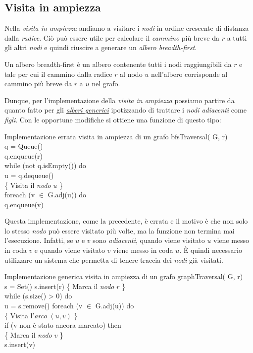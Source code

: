 \subsection{Visita in ampiezza}
Nella \emph{visita in ampiezza} andiamo a visitare i \emph{nodi} in ordine
crescente di distanza dalla \emph{radice}. Ciò può essere utile per calcolare
il \emph{cammino} più breve da $r$ a tutti gli altri \emph{nodi} e quindi
riuscire a generare un \emph{albero breadth-first}.
\begin{definition}
    Un albero breadth-first è un albero contenente tutti i nodi raggiungibili da
    $r$ e tale per cui il cammino dalla radice $r$ al nodo $u$ nell'albero
    corrisponde al cammino più breve da $r$ a $u$ nel grafo.
\end{definition}\noindent
Dunque, per l'implementazione della \emph{visita in ampiezza} possiamo partire
da quanto fatto per gli \hyperref[code:15]{\emph{alberi generici}} ipotizzando
di trattare i \emph{nodi adiacenti} come \emph{figli}. Con le opportune
modifiche si ottiene una funzione di questo tipo:
\begin{minicode}{Implementazione errata visita in ampiezza di un grafo}
\ind bfsTraversal( G,  r)\\
     q = Queue()\\
    q.enqueue(r)\\
    \indf while (not q.isEmpty()) do\\
         u = q.dequeue()\\
        \{ Visita il \emph{nodo} $u$ \}\\
        \indff foreach (v $\in$ G.adj(u)) do\\
            q.enqueue(v)\hfill{}
\end{minicode}\noindent
Questa implementazione, come la precedente, è errata e il motivo è che non solo
lo stesso \emph{nodo} può essere visitato più volte, ma la funzione non termina
mai l'esecuzione. Infatti, se $u$ e $v$ sono \emph{adiacenti}, quando viene
visitato $u$ viene messo in coda $v$ e quando viene visitato $v$ viene messo in
coda $u$. È quindi necessario utilizzare un sistema che permetta di tenere
traccia dei
\emph{nodi} già visitati.
\begin{minicode}{Implementazione generica visita in ampiezza di un grafo}
\ind graphTraversal( G,  r)\\
     s = Set()\hfill{}
    s.insert(r)\hfill{}
    \{ Marca il \emph{nodo} $r$ \}\\
    \indf while (s.size() > 0) do\\
         u = s.remove()\hfill{}
        \indff foreach (v $\in$ G.adj(u)) do\\
            \{ Visita l'\emph{arco} $(u,v)$ \}\\
            \indfff if (v non è stato ancora marcato) then\\
                \{ Marca il \emph{nodo} $v$ \}\\
                s.insert(v)\hfill{}
\end{minicode}
